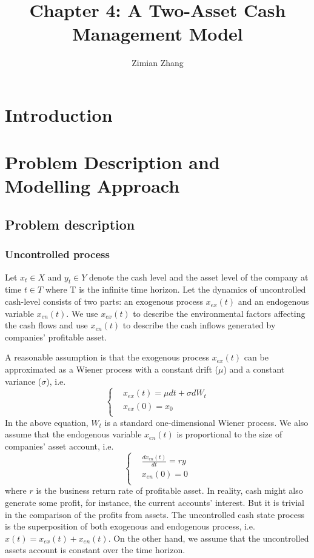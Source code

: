 \documentclass[12pt]{article}
\author{Zimian Zhang}
\title{Chapter 4: A Two-Asset Cash Management Model}
\begin{document}
\maketitle
\setcounter{page}{0}
\thispagestyle{empty}


\newpage
\tableofcontents
\setcounter{page}{0}
\thispagestyle{empty}

\newpage

\section{Introduction}
\section{Problem Description and Modelling Approach}
\subsection{Problem description}
\subsubsection{Uncontrolled process}
Let $x_t \in X$ and $y_t \in Y$ denote the cash level and the asset level of the company at time $t \in T$ where T is the infinite time horizon. Let the dynamics of uncontrolled cash-level consists of two parts: an exogenous process $x_{ex}(t)$ and an endogenous variable $x_{en}(t)$. We use $x_{ex}(t)$ to describe the environmental factors affecting the cash flows and use $x_{en}(t)$ to describe the cash inflows generated by companies' profitable asset. 



A reasonable assumption is that the exogenous process $x_{ex}(t)$ can be approximated as a Wiener process with a constant drift ($\mu$) and a constant variance ($\sigma$), i.e. $$ \left\{ 
\begin{aligned}
&x_{ex}(t) = \mu dt + \sigma d W_t \\
&x_{ex}(0) = x_0\\
\end{aligned}
\right.$$
In the above equation, $W_t$ is a standard one-dimensional Wiener process.
We also assume that the endogenous variable $x_{en}(t)$ is proportional to the size of companies' asset account, i.e. $$ \left\{ 
\begin{aligned}
&\frac{dx_{en}(t)}{dt} = ry\\
&x_{en}(0) = 0\\
\end{aligned}
\right.$$ where $r$ is the business return rate of profitable asset. In reality, cash might also generate some profit, for instance, the current accounts' interest. But it is trivial in the comparison of the profits from assets. The uncontrolled cash state process is the superposition of both exogenous and endogenous process, i.e. $x(t) = x_{ex}(t) + x_{en}(t)$. On the other hand, we assume that the uncontrolled assets account is constant over the time horizon.
\end{document}
